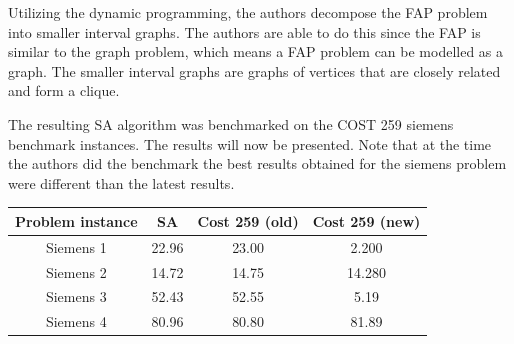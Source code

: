 Utilizing the dynamic programming, the authors decompose the FAP problem into smaller interval graphs. The authors are able to do this since the FAP is similar to the graph problem, which means a FAP problem can be modelled as a graph\cite{ProblemDecompMIFAP}. The smaller interval graphs are graphs of vertices that are closely related and form a clique\cite{ProblemDecompMIFAP}.

The resulting SA algorithm was benchmarked on the COST 259 siemens benchmark instances. The results will now be presented. Note that at the time the authors did the benchmark the best results obtained for the siemens problem were different than the latest results.

\begin{center}
	\begin{tabular}{| c | c | c | c |}
	\hline
	Problem instance & SA & Cost 259 (old) & Cost 259 (new) \\ \hline
	Siemens 1 & 22.96 & 23.00 & 2.200\\ \hline
	Siemens 2 & 14.72 & 14.75 & 14.280\\ \hline
	Siemens 3 & 52.43 & 52.55 & 5.19\\ \hline
	Siemens 4 & 80.96 & 80.80 & 81.89\\ \hline
	\end{tabular}
\end{center}

